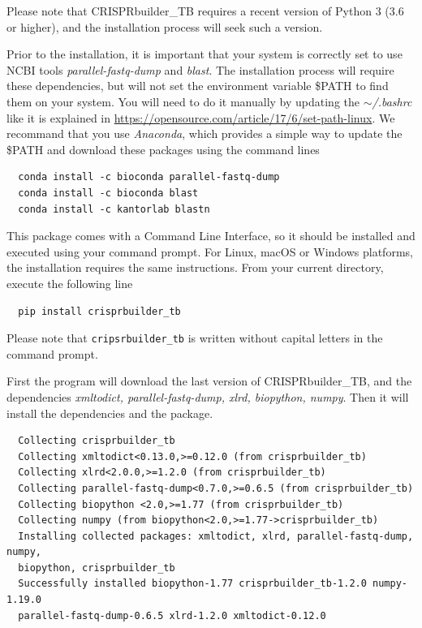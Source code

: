 \documentclass[twoside,a4paper,11pt,frenchb,openany]{report}
\begin{document}
Please note that CRISPRbuilder\_TB requires a recent version of Python 3 (3.6 or higher), and the installation process will seek such a version.

Prior to the installation, it is important that your system is correctly set to use NCBI tools \textit{parallel-fastq-dump} and \textit{blast}. The installation process will require these dependencies, but will not set the environment variable \$PATH to find them on your system. You will need to do it manually by updating the \textit{$\sim$/.bashrc} like it is explained in \url{https://opensource.com/article/17/6/set-path-linux}. We recommand that you use \textit{Anaconda}, which provides a simple way to update the \$PATH and download these packages using the command lines

\begin{verbatim}
  conda install -c bioconda parallel-fastq-dump
  conda install -c bioconda blast
  conda install -c kantorlab blastn
\end{verbatim}

    This package comes with a Command Line Interface, so it should be
installed and executed using your command prompt. For Linux, macOS or
Windows platforms, the installation requires the same instructions. From your current directory, execute the following line

    \begin{verbatim}
  pip install crisprbuilder_tb
\end{verbatim}

    Please note that \texttt{cripsrbuilder\_tb} is written without capital
letters in the command prompt.

First the program will download the last version of CRISPRbuilder\_TB, and the dependencies \textit{xmltodict, parallel-fastq-dump, xlrd, biopython, numpy}. Then it will install the dependencies and the package.

\begin{verbatim}  Collecting crisprbuilder_tb
  Collecting xmltodict<0.13.0,>=0.12.0 (from crisprbuilder_tb)
  Collecting xlrd<2.0.0,>=1.2.0 (from crisprbuilder_tb)
  Collecting parallel-fastq-dump<0.7.0,>=0.6.5 (from crisprbuilder_tb)
  Collecting biopython <2.0,>=1.77 (from crisprbuilder_tb)
  Collecting numpy (from biopython<2.0,>=1.77->crisprbuilder_tb)
  Installing collected packages: xmltodict, xlrd, parallel-fastq-dump, numpy, 
  biopython, crisprbuilder_tb
  Successfully installed biopython-1.77 crisprbuilder_tb-1.2.0 numpy-1.19.0 
  parallel-fastq-dump-0.6.5 xlrd-1.2.0 xmltodict-0.12.0
\end{verbatim}
\end{document}
